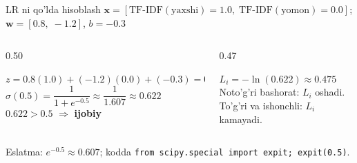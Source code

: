 \documentclass[aspectratio=169,11pt]{beamer}
\begin{document}
\begin{frame}{LR ni qo'lda hisoblash}
  \small
  $\mathbf{x}=[\mathrm{TF\text{-}IDF(yaxshi)}{=}1.0,\;
  \mathrm{TF\text{-}IDF(yomon)}{=}0.0]$;\quad
  $\mathbf{w}=[0.8,\;{-}1.2]$,\; $b=-0.3$
  \vspace{5pt}
  \begin{columns}[T]
    \begin{column}{0.50\textwidth}
      \begin{tcolorbox}[defbox,title=Forward pass]
        \small
        $z = 0.8(1.0)+(-1.2)(0.0)+(-0.3) = 0.5$\\[5pt]
        $\sigma(0.5)=\dfrac{1}{1+e^{-0.5}}
        \approx\dfrac{1}{1.607}\approx 0.622$\\[5pt]
        $0.622>0.5$
        $\Rightarrow$ \textcolor{deepgreen}{\textbf{ijobiy}} \checkmark
      \end{tcolorbox}
    \end{column}
    \begin{column}{0.47\textwidth}
      \begin{tcolorbox}[defbox,title=Bitta namuna zarari ($y{=}1$)]
        \small
        $L_i = -\ln(0.622)\approx 0.475$\\[5pt]
        \textcolor{halfgray}{\footnotesize
          Noto'g'ri bashorat: $L_i$ oshadi.\\
          To'g'ri va ishonchli: $L_i$ kamayadi.}
      \end{tcolorbox}
    \end{column}
  \end{columns}
  \vspace{5pt}
  \textcolor{halfgray}{\footnotesize
    Eslatma: $e^{-0.5}\approx 0.607$;\quad
    kodda \texttt{from scipy.special import expit; expit(0.5)}.}
\end{frame}
\end{document}
